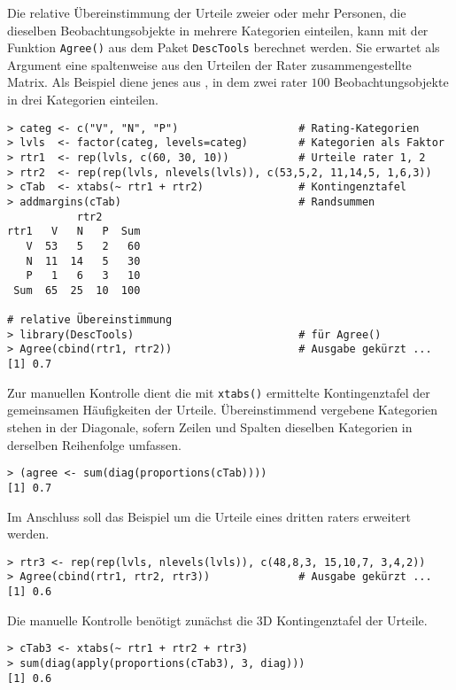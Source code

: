 Die relative Übereinstimmung der Urteile zweier oder mehr Personen, die dieselben Beobachtungsobjekte in mehrere Kategorien einteilen, kann mit der Funktion \lstinline!Agree()! aus dem Paket \lstinline!DescTools! berechnet werden. Sie erwartet als Argument eine spaltenweise aus den Urteilen der Rater zusammengestellte Matrix. Als Beispiel diene jenes aus , in dem zwei rater $100$ Beobachtungsobjekte in drei Kategorien einteilen.
\begin{lstlisting}
> categ <- c("V", "N", "P")                   # Rating-Kategorien
> lvls  <- factor(categ, levels=categ)        # Kategorien als Faktor
> rtr1  <- rep(lvls, c(60, 30, 10))           # Urteile rater 1, 2
> rtr2  <- rep(rep(lvls, nlevels(lvls)), c(53,5,2, 11,14,5, 1,6,3))
> cTab  <- xtabs(~ rtr1 + rtr2)               # Kontingenztafel
> addmargins(cTab)                            # Randsummen
           rtr2
rtr1   V   N   P  Sum
   V  53   5   2   60
   N  11  14   5   30
   P   1   6   3   10
 Sum  65  25  10  100

# relative Übereinstimmung
> library(DescTools)                          # für Agree()
> Agree(cbind(rtr1, rtr2))                    # Ausgabe gekürzt ...
[1] 0.7
\end{lstlisting}

Zur manuellen Kontrolle dient die mit \lstinline!xtabs()! ermittelte Kontingenztafel der gemeinsamen Häufigkeiten der Urteile. Übereinstimmend vergebene Kategorien stehen in der Diagonale, sofern Zeilen und Spalten dieselben Kategorien in derselben Reihenfolge umfassen.
\begin{lstlisting}
> (agree <- sum(diag(proportions(cTab))))
[1] 0.7
\end{lstlisting}

Im Anschluss soll das Beispiel um die Urteile eines dritten raters erweitert werden.
\begin{lstlisting}
> rtr3 <- rep(rep(lvls, nlevels(lvls)), c(48,8,3, 15,10,7, 3,4,2))
> Agree(cbind(rtr1, rtr2, rtr3))              # Ausgabe gekürzt ...
[1] 0.6
\end{lstlisting}

Die manuelle Kontrolle benötigt zunächst die 3D Kontingenztafel der Urteile.
\begin{lstlisting}
> cTab3 <- xtabs(~ rtr1 + rtr2 + rtr3)
> sum(diag(apply(proportions(cTab3), 3, diag)))
[1] 0.6
\end{lstlisting}

